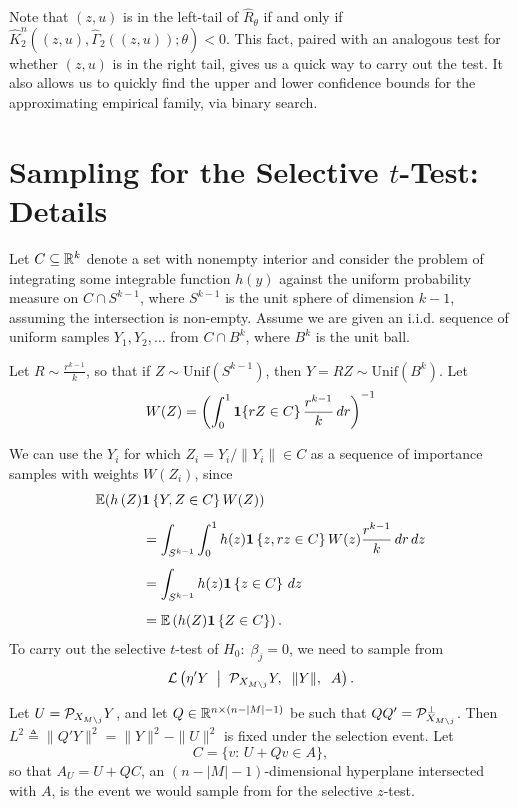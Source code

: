 \documentclass{article}
\theoremstyle{definition}
\newcommand{\bX}{X}
\newcommand{\Gv}{\;\;\big|\;\;}
\newcommand{\proj}{\cP}
\newcommand{\cL}{\mathcal{L}}
\begin{document}
\begin{appendix}
Note that $(z,u)$ is in the left-tail of $\widehat R_\theta$ if and only if ${\widehat K_2^n\left((z,u),\widehat\Gamma_2((z,u));\theta\right) < 0}$. This fact, paired with an analogous test for whether $(z,u)$ is in the right tail, gives us a quick way to carry out the test. It also allows us to quickly find the upper and lower confidence bounds for the approximating empirical family, via binary search.

\section{Sampling for the Selective $t$-Test: Details}\label{sec:sphereSample}

Let $C \subseteq \mathbb{R}^k$ denote a set with nonempty interior and consider the problem of integrating some integrable function $h(y)$ against the uniform probability measure on $C \cap  S^{k-1}$, where $S^{k-1}$ is the unit sphere of dimension $k-1$, assuming the intersection is non-empty. Assume we are given an i.i.d. sequence of uniform samples $Y_1,Y_2, \ldots$ from $C \cap B^k$, where $B^k$ is the unit ball.

Let $R \sim \frac{r^{k-1}}{k}$, so that if $Z\sim\text{Unif}(S^{k-1})$, then $Y=RZ \sim
\text{Unif}(B^k)$. Let
\begin{equation}
  W(Z) =
  \left(\int_0^1\mathbf{1}\{rZ \in C\}\, \frac{r^{k-1}}{k}\, dr\right)^{-1}
\end{equation}

We can use the $Y_i$ for which $Z_i = Y_i/\|Y_i\| \in C$ as a sequence of importance samples with weights $W(Z_i)$, since
\begin{align}
 \mathbb{E}(h\left(Z\right) &\mathbf{1}\left\{Y,Z\in
      C\right\} W(Z))\\[5pt]
  &= \int_{S^{k-1}}\int_0^1 h(z)\mathbf{1}\left\{z,rz\in C\right\}
  W(z) \frac{r^{k-1}}{k}\, dr\,dz\\[5pt]
  &= \int_{S^{k-1}} h(z)\mathbf{1}\left\{z\in C\right\} \,dz\\[5pt]
  &= \mathbb{E}\left(h(Z) \mathbf{1}\left\{Z\in C\right\}\right).
\end{align}
\newcommand{\bQ}{{Q}}
To carry out the selective $t$-test of $H_0:\; \beta_j = 0$, we need to sample from
\begin{equation}
  \cL\left( \eta'Y \Gv \proj_{\bX_{M\setminus j}} Y,\;\; \|Y\|, \;\;A\right).
\end{equation}

Let $U= \proj_{\bX_{M\setminus j}} Y$, and let $\bQ\in\R^{n\times (n-|M|-1)}$ be such that $\bQ\bQ'=\proj_{\bX_{M\setminus j}}^\perp$. Then $L^2\triangleq \|\bQ'Y\|^2 = \|Y\|^2 - \|U\|^2$ is fixed under the selection event. Let
\begin{equation}
  C = \{v:\, U+\bQ v\in A\},
\end{equation}
so that $A_U = U + \bQ C$, an $(n-|M|-1)$-dimensional hyperplane intersected with $A$, is the event we would sample from for the selective $z$-test.


\end{appendix}
\end{document}
